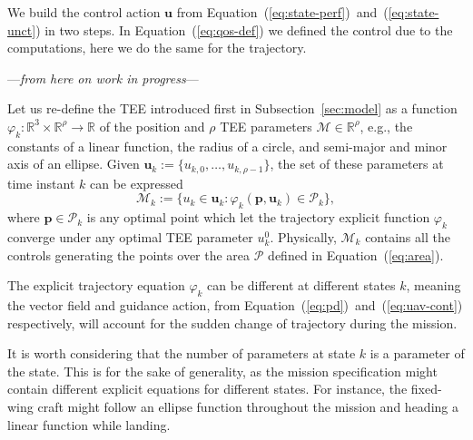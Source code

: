 \documentclass[letterpaper,10pt,conference]{ieeeconf}
\begin{document}
We build the control action $\mathbf{u}$ from Equation~(\ref{eq:state-perf})~and~(\ref{eq:state-unct}) in two steps. In Equation~(\ref{eq:qos-def}) we defined the control due to the computations, here we do the same for the trajectory.

\begin{center}\vspace{.2cm}---\emph{from here on work in progress}---\vspace{.6cm}\end{center}

Let us re-define the TEE introduced first in Subsection~\ref{sec:model} as a function $\varphi_k:\mathbb{R}^3\times\mathbb{R}^\rho\rightarrow\mathbb{R}$ of the position and $\rho$ TEE parameters $\mathcal{M}\in\mathbb{R}^\rho$, e.g., the constants of a linear function, the radius of a circle, and semi-major and minor axis of an ellipse. Given $\mathbf{u}_{k}:=\{u_{k,0},\dots,u_{k,\rho-1}\}$, the set of these parameters at time instant $k$ can be expressed
\begin{equation}\label{eq:tee-def}
  \mathcal{M}_k:=\{u_k\in\mathbf{u}_k : \varphi_k(\mathbf{p},\mathbf{u}_k)\in\mathcal{P}_k\},
\end{equation}
where $\mathbf{p}\in\mathcal{P}_k$ is any optimal point which let the trajectory explicit function $\varphi_k$ converge under any optimal TEE parameter $u_k^0$. Physically, $\mathcal{M}_k$ contains all the controls generating the points over the area $\mathcal{P}$ defined in Equation~(\ref{eq:area}). 

The explicit trajectory equation $\varphi_k$ can be different at different states $k$, meaning the vector field and guidance action, from Equation~(\ref{eq:pd})~and~(\ref{eq:uav-cont}) respectively, will account for the sudden change of trajectory during the mission.

It is worth considering that the number of parameters at state $k$ is a parameter of the state. This is for the sake of generality, as the mission specification might contain different explicit equations for different states. For instance, the fixed-wing craft might follow an ellipse function throughout the mission and heading a linear function while landing. 
\end{document}
